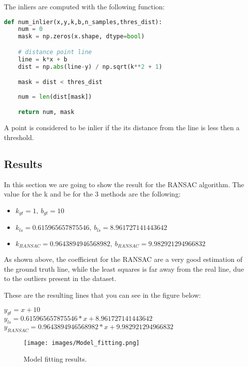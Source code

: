 \documentclass{ETHExercise}
\begin{document}
The inliers are computed with the following function:
\begin{lstlisting}[language=Python, caption=RANSAC]
  def num_inlier(x,y,k,b,n_samples,thres_dist):
    num = 0
    mask = np.zeros(x.shape, dtype=bool)

    # distance point line
    line = k*x + b
    dist = np.abs(line-y) / np.sqrt(k**2 + 1)

    mask = dist < thres_dist
  
    num = len(dist[mask])

    return num, mask
\end{lstlisting}
A point is considered to be inlier if the its distance from the line is less then a threshold.


\subsection{Results}
In this section we are going to show the result for the RANSAC algorithm.
The value for the k and be for the 3 methods are the following:

\begin{itemize}
  \item $k_{gt} = 1,\ b_{gt} = 10$
  \item $k_{ls} = 0.615965657875546, \ b_{ls} = 8.961727141443642$
  \item $k_{RANSAC} = 0.9643894946568982,\ b_{RANSAC} = 9.982921294966832$
\end{itemize}

As shown above, the coefficient for the RANSAC are a very good estimation of the
ground truth line, while the least squares is far away from the real
line, due to the outliers present in the dataset.

These are the resulting lines that you can see in the figure below:
\begin{center}
  $y_{gt} = x + 10$\\
  $y_{ls} = 0.615965657875546 * x + 8.961727141443642 $\\
  $y_{RANSAC} = 0.9643894946568982 * x + 9.982921294966832$
\end{center}

\begin{figure}[!h]
  \texttt{[image: images/Model\_fitting.png]}
  \caption{Model fitting results.}
\end{figure}
\end{document}
